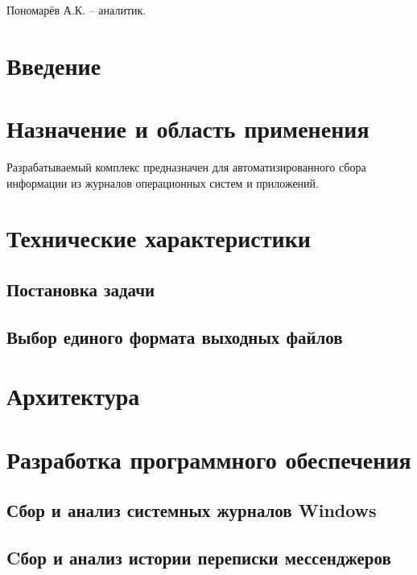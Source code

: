 \documentclass[russian,utf8,14pt,simple]{eskdtext}
\begin{document}
Пономарёв А.К. -- аналитик.

\newpage
{}
\renewcommand\contentsname{\hfill Содержание \hfill}
\tableofcontents

\newpage
{}
\section{Введение}


\section{Назначение и область применения}
Разрабатываемый комплекс предназначен для автоматизированного сбора информации из журналов операционных систем и приложений.

\section{Технические характеристики}
\subsection{Постановка задачи}


\subsection{Выбор единого формата выходных файлов}


\section{Архитектура}


\section{Разработка программного обеспечения}

\subsection{Сбор и анализ системных журналов Windows} %



\subsection{Cбор и анализ истории переписки мессенджеров} %
\end{document}
